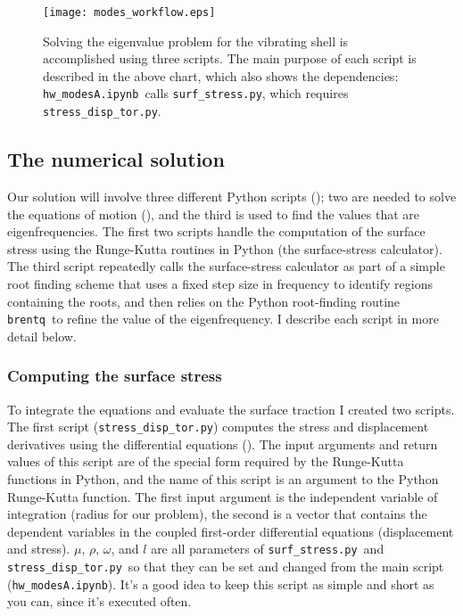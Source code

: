 \documentclass[11pt,titlepage,fleqn]{article}
\newcommand{\tfilemain}{{\tt hw\_modesA.ipynb}}
\newcommand{\tfiless}{{\tt surf\_stress.py}}
\newcommand{\tfilesdt}{{\tt stress\_disp\_tor.py}}
\newcommand{\rfind}{{\tt brentq}}
\begin{document}

\begin{figure}[h]
\centering
\texttt{[image: modes\_workflow.eps]}
\caption[]
{{
Solving the eigenvalue problem for the vibrating shell is accomplished using three scripts. The main purpose of each script is described in the above chart, which also shows the dependencies: \tfilemain\ calls \tfiless, which requires \tfilesdt.
\label{fig:workflow}
}}
\end{figure}


\pagebreak
\subsection{The numerical solution}

Our solution will involve three different Python scripts (); two are needed to solve the equations of motion (), and the third is used to find the values that are eigenfrequencies. The first two scripts handle the computation of the surface stress using the Runge-Kutta routines in Python (the surface-stress calculator). The third script repeatedly calls the surface-stress calculator as part of a simple root finding scheme that uses a fixed step size in frequency to identify regions containing the roots, and then relies on the Python root-finding routine \rfind\ to refine the value of the eigenfrequency. I describe each script in more detail below.

\subsubsection{Computing the surface stress}

To integrate the equations and evaluate the surface traction I created two scripts. The first script (\tfilesdt) computes the stress and displacement derivatives using the differential equations (). The input arguments and return values of this script are of the special form required by the Runge-Kutta functions in Python, and the name of this script is an argument to the Python Runge-Kutta function. The first input argument is the independent variable of integration (radius for our problem), the second is a vector that contains the dependent variables in the coupled first-order differential equations (displacement and stress). $\mu$, $\rho$, $\omega$, and $l$ are all parameters of \tfiless\ and \tfilesdt\ so that they can be set and changed from the main script (\tfilemain). It's a good idea to keep this script as simple and short as you can, since it's executed often.
\end{document}
